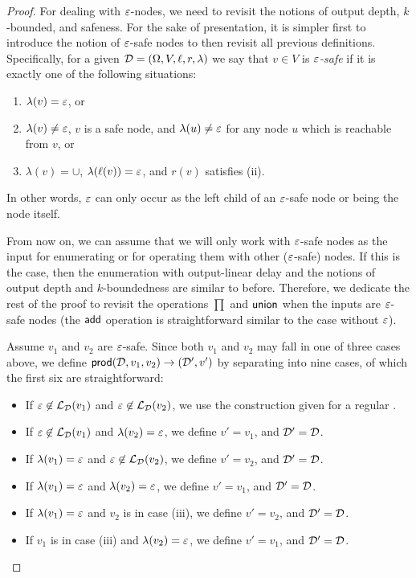 \begin{proof}
For dealing with $\varepsilon$-nodes, we need to revisit the notions of output depth, $k$-bounded, and safeness. For the sake of presentation, it is simpler first to introduce the notion of $\varepsilon$-safe nodes to then revisit all previous definitions. Specifically, for a given \dsepsabbr $\mathcal{D} = (\Omega, V, \ell, r, \lambda)$ we say that $v \in V$ is \emph{$\varepsilon$-safe} if it is exactly one of the following situations:
\begin{enumerate}
	\item $\lambda(v) = \varepsilon$, or 
	\item $\lambda(v) \neq \varepsilon$, $v$ is a safe node, and  $\lambda(u) \neq \varepsilon$ for any node $u$ which is reachable from $v$, or 
	\item $\lambda(v) = \cup$, $\lambda(\ell(v)) = \varepsilon$, and $r(v)$ satisfies (ii). 
\end{enumerate}
In other words, $\varepsilon$ can only occur as the left child of an $\varepsilon$-safe node or being the node itself. 

From now on, we can assume that we will only work with $\varepsilon$-safe nodes as the input for enumerating or for operating them with other ($\varepsilon$-safe) nodes. If this is the case, then the enumeration with output-linear delay and the notions of output depth and $k$-boundedness are similar to before. Therefore, we dedicate the rest of the proof to revisit the operations $\prod$ and $\mathsf{union}$ when the inputs are $\varepsilon$-safe nodes (the $\mathsf{add}$ operation is straightforward similar to the case without $\varepsilon$). 

Assume $v_1$ and $v_2$ are $\varepsilon$-safe. 
Since both $v_1$ and $v_2$ may fall in one of three cases above, we define $\mathsf{prod}(\mathcal{D},v_1,v_2) \to (\mathcal{D}',v')$ by separating into nine cases, of which the first six are straightforward: 
\begin{itemize}
	\item If $\varepsilon\not\in\mathcal{L}_{\mathcal{D}}(v_1)$ and $\varepsilon\not\in\mathcal{L}_{\mathcal{D}}(v_2)$,  we use the construction given for a regular \dsabbr.
	\item If $\varepsilon\not\in\mathcal{L}_{\mathcal{D}}(v_1)$ and $\lambda(v_2) = \varepsilon$, we define $v' = v_1$, and $\mathcal{D}' = \mathcal{D}$.
	\item If $\lambda(v_1) = \varepsilon$ and $\varepsilon\not\in\mathcal{L}_{\mathcal{D}}(v_2)$, we define $v' = v_2$, and $\mathcal{D}' = \mathcal{D}$.
	\item If $\lambda(v_1) = \varepsilon$ and $\lambda(v_2) = \varepsilon$, we define $v' = v_1$, and $\mathcal{D}' = \mathcal{D}$.
	\item If $\lambda(v_1) = \varepsilon$ and $v_2$ is in case (iii), we define $v' = v_2$, and $\mathcal{D}' = \mathcal{D}$.
	\item If $v_1$ is in case (iii) and $\lambda(v_2) = \varepsilon$, we define $v' = v_1$, and $\mathcal{D}' = \mathcal{D}$.
\end{itemize}


\end{proof}
